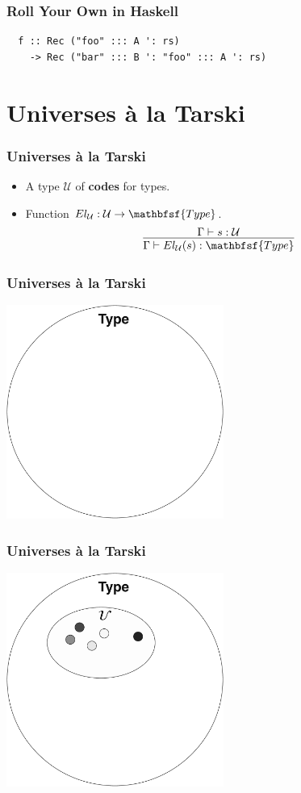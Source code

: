 \documentclass[tikz, 12pt]{beamer}
\def\Type{\mathbfsf{Type}}
\begin{document}
\begin{frame}[fragile]
  \frametitle{Roll Your Own in Haskell}\pause
  \begin{lstlisting}
  f :: Rec ("foo" ::: A ': rs)
    -> Rec ("bar" ::: B ': "foo" ::: A ': rs)
  \end{lstlisting}
\end{frame}

\section{Universes \`a la Tarski}

\begin{frame}
  \frametitle{Universes \`a la Tarski}\pause
  \begin{itemize}
    \item A type $\mathcal{U}$ of \textbf{codes} for types.
      \pause
    \item Function $El_\mathcal{U} : \mathcal{U}\to\Type$.
      \pause
      \[
        \infer{
          \Gamma\vdash El_\mathcal{U}(s) : \Type
        }{
          \Gamma\vdash s : \mathcal{U}
        }
      \]
  \end{itemize}
\end{frame}

\begin{frame}
  \frametitle{Universes \`a la Tarski}
  \begin{center}
    \includegraphics[width=2.8in]{universe-empty.pdf}
  \end{center}
\end{frame}

\begin{frame}
  \frametitle{Universes \`a la Tarski}
  \begin{center}
    \includegraphics[width=2.8in]{universe-embedded.pdf}
  \end{center}
\end{frame}
\end{document}
